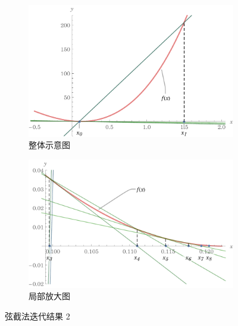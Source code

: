 \documentclass[11pt]{article}
\begin{document}
\begin{figure}
\begin{subfigure}{.65\textwidth}
\begin{tabular}{|l|c|c|}
            \hline
        \end{tabular}
        \label{table:Secant2}
    \end{subfigure}
    \begin{subfigure}{.33\textwidth}
        \centering
        \includegraphics[scale = 0.33]{Figure/Secant2.pdf}
        \caption{整体示意图}
        \label{figure:Secant2}
    \end{subfigure}
    \begin{subfigure}{\textwidth}
        \centering
        \includegraphics[scale = 0.8]{Figure/Secant2-zoom.pdf}
        \caption{局部放大图}
        \label{figure:Secant2-zoom}
    \end{subfigure}
    \caption{弦截法迭代结果 2 }
    \label{Secant2}
\end{figure}
\end{document}
